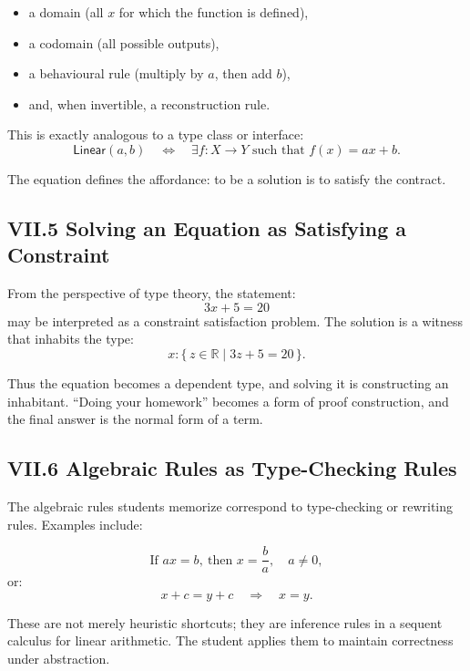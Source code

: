 \documentclass[11pt,letterpaper]{article}
\begin{document}
\begin{itemize}
    \item a domain (all \(x\) for which the function is defined),
    \item a codomain (all possible outputs),
    \item a behavioural rule (multiply by \(a\), then add \(b\)),
    \item and, when invertible, a reconstruction rule.
\end{itemize}

This is exactly analogous to a type class or interface:
\[
\mathsf{Linear}(a,b) \quad \iff \quad \exists f : X \to Y \text{ such that } f(x) = ax + b.
\]

The equation defines the affordance: to be a solution is to satisfy the contract.

\subsection{VII.5 Solving an Equation as Satisfying a Constraint}

From the perspective of type theory, the statement:
\[
3x + 5 = 20
\]
may be interpreted as a constraint satisfaction problem. The solution is a witness that inhabits the type:
\[
x : \{\,z \in \mathbb{R} \mid 3z + 5 = 20\,\}.
\]

Thus the equation becomes a dependent type, and solving it is constructing an inhabitant. ``Doing your homework'' becomes a form of proof construction, and the final answer is the normal form of a term.

\subsection{VII.6 Algebraic Rules as Type-Checking Rules}

The algebraic rules students memorize correspond to type-checking or rewriting rules. Examples include:

\[
\text{If } ax = b,\ \text{then } x = \frac{b}{a}, \quad a \neq 0,
\]
or:
\[
x + c = y + c \quad \Rightarrow \quad x = y.
\]

These are not merely heuristic shortcuts; they are inference rules in a sequent calculus for linear arithmetic. The student applies them to maintain correctness under abstraction.
\end{document}

